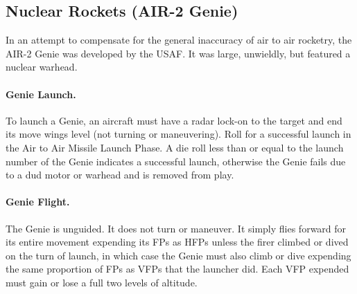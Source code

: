 \begin{advancedrules}

\section{Nuclear Rockets (AIR-2 Genie)}


In an attempt to compensate for the general inaccuracy of air to air rocketry, the AIR-2 Genie was developed by the USAF. It was large, unwieldly, but featured a nuclear warhead.

\paragraph{Genie Launch.} To launch a Genie, an aircraft must have a radar lock-on to the target and end its move wings level (not turning or maneuvering). Roll for a successful launch in the Air to Air Missile Launch Phase. A die roll less than or equal to the launch number of the Genie indicates a successful launch, otherwise the Genie fails due to a dud motor or warhead and is removed from play.

\paragraph{Genie Flight.} The Genie is unguided. It does not turn or maneuver. It simply flies forward for its entire movement expending its FPs as HFPs unless the firer climbed or dived on the turn of launch, in which case the Genie must also climb or dive expending the same proportion of FPs as VFPs that the launcher did. Each VFP expended must gain or lose a full two levels of altitude.


\end{advancedrules}
